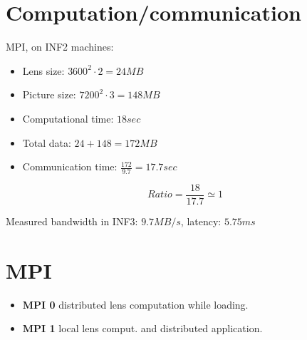 \documentclass[12pt]{article}
\begin{document}
\section{Computation/communication}

MPI, on INF2 machines:
\begin{itemize}
    \item Lens size: $3600^2 \cdot 2 = 24 MB$
    \item Picture size:  $7200^2 \cdot 3 = 148 MB$
    \item Computational time: $18 sec$
    \item Total data: $24 + 148 = 172 MB$
    \item Communication time: $\frac{172}{9.7} = 17.7 sec$
\end{itemize}

$$Ratio = \frac{18}{17.7} \simeq 1$$

\small Measured bandwidth in INF3: $9.7MB/s$, latency: $5.75ms$

\section{MPI}

\begin{itemize}
    \item \textbf{MPI 0} distributed lens computation while loading.
    \item \textbf{MPI 1} local lens comput. and distributed application.
\end{itemize}
\end{document}
